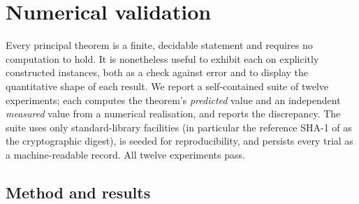 \documentclass[twocolumn,10pt,a4paper]{article}
\theoremstyle{thmstyle}
\theoremstyle{definition}
\theoremstyle{remark}
\begin{document}
\section{Numerical validation}
\label{sec:validation}

Every principal theorem is a finite, decidable statement and requires no
computation to hold. It is nonetheless useful to exhibit each on
explicitly constructed instances, both as a check against error and to
display the quantitative shape of each result. We report a self-contained
suite of twelve experiments; each computes the theorem's
\emph{predicted} value and an independent \emph{measured} value from a
numerical realisation, and reports the discrepancy. The suite uses only
standard-library facilities (in particular the reference \textsf{SHA-1} of
\citep{nist180-4} as the cryptographic digest), is seeded for
reproducibility, and persists every trial as a machine-readable record.
All twelve experiments pass.

\subsection{Method and results}
\end{document}
